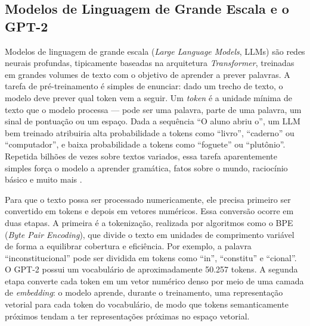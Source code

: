 
\subsection{Modelos de Linguagem de Grande Escala e o GPT-2}\label{subsec:llm_gpt2}

Modelos de linguagem de grande escala (\textit{Large Language Models}, LLMs) são redes
neurais profundas, tipicamente baseadas na arquitetura \textit{Transformer}, treinadas em
grandes volumes de texto com o objetivo de aprender a prever palavras. A tarefa de
pré-treinamento é simples de enunciar: dado um trecho de texto, o modelo deve prever
qual token vem a seguir. Um \textit{token} é a unidade mínima de texto que o modelo
processa --- pode ser uma palavra, parte de uma palavra, um sinal de pontuação ou um
espaço. Dada a sequência ``O aluno abriu o'', um LLM bem treinado atribuiria alta
probabilidade a tokens como ``livro'', ``caderno'' ou ``computador'', e baixa probabilidade
a tokens como ``foguete'' ou ``plutônio''. Repetida bilhões de vezes sobre textos variados,
essa tarefa aparentemente simples força o modelo a aprender gramática, fatos sobre o mundo,
raciocínio básico e muito mais \cite{Radford2019}.

Para que o texto possa ser processado numericamente, ele precisa primeiro ser convertido
em tokens e depois em vetores numéricos. Essa conversão ocorre em duas etapas. A primeira
é a tokenização, realizada por algoritmos como o BPE (\textit{Byte Pair Encoding}), que
divide o texto em unidades de comprimento variável de forma a equilibrar cobertura e
eficiência. Por exemplo, a palavra ``inconstitucional'' pode ser dividida em tokens como
``in'', ``constitu'' e ``cional''. O GPT-2 possui um vocabulário de aproximadamente
50.257 tokens. A segunda etapa converte cada token em um vetor numérico denso por meio
de uma camada de \textit{embedding}: o modelo aprende, durante o treinamento, uma
representação vetorial para cada token do vocabulário, de modo que tokens semanticamente
próximos tendam a ter representações próximas no espaço vetorial.

